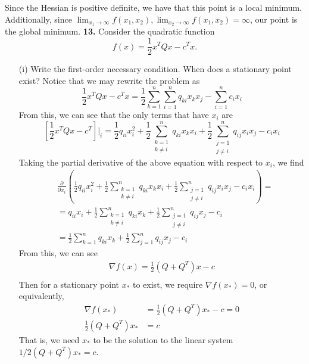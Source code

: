 \documentclass{article}
\begin{document}
Since the Hessian is positive definite, we have that this point is a local minimum. Additionally, since $\lim_{x_1 \to \infty} f(x_1,x_2), \lim_{x_2 \to \infty} f(x_1,x_2) = \infty$, our point is the global minimum.
\newline\newline
\textbf{13.} Consider the quadratic function
\[f(x) = \frac{1}{2}x^TQx - c^Tx.\]
\begin{itemize}
    \item[(i)] Write the first-order necessary condition. When does a stationary point exist?
    \newline\newline
    Notice that we may rewrite the problem as 
    \[\frac{1}{2}x^TQx - c^Tx = \frac{1}{2}\sum_{k=1}^n\sum_{i=1}^nq_{ki}x_kx_j - \sum_{i=1}^nc_ix_i\]
    From this, we can see that the only terms that have $x_i$ are 
    \[\left[\frac{1}{2}x^TQx - c^T\right]\bigg|_{i} = \frac{1}{2}q_{ii}x_i^2 + \frac{1}{2}\sum_{\substack{k=1\\k\neq i}}^nq_{ki}x_kx_i + \frac{1}{2}\sum_{\substack{j=1\\j\neq i}}^nq_{ij}x_ix_j - c_ix_i\]
    Taking the partial derivative of the above equation with respect to $x_i$, we find
    \begin{align*}
        &\frac{\partial}{\partial x_i}\left(\frac{1}{2}q_{ii}x_i^2 + \frac{1}{2}\sum_{\substack{k=1\\k\neq i}}^nq_{ki}x_kx_i + \frac{1}{2}\sum_{\substack{j=1\\j\neq i}}^nq_{ij}x_ix_j - c_ix_i\right) =\\
        &= q_{ii}x_i + \frac{1}{2}\sum_{\substack{k=1\\k\neq i}}^nq_{ki}x_k + \frac{1}{2}\sum_{\substack{j=1\\j\neq i}}^nq_{ij}x_j - c_i\\
        &= \frac{1}{2}\sum_{k=1}^nq_{ki}x_k + \frac{1}{2}\sum_{j=1}^nq_{ij}x_j - c_i
    \end{align*}
    From this, we can see
    \begin{align*}
        \nabla f(x) = \frac{1}{2}(Q + Q^T)x - c\\
    \end{align*}
    Then for a stationary point $x_*$ to exist, we require $\nabla f(x_*) = 0$, or equivalently, 
    \begin{align*}
        \nabla f(x_*) &= \frac{1}{2}(Q + Q^T)x_* - c = 0\\
        \frac{1}{2}(Q + Q^T)x_* &= c
    \end{align*}
That is, we need $x_*$ to be the solution to the linear system $1/2(Q + Q^T)x_* = c$.
    

\end{itemize}
\end{document}
